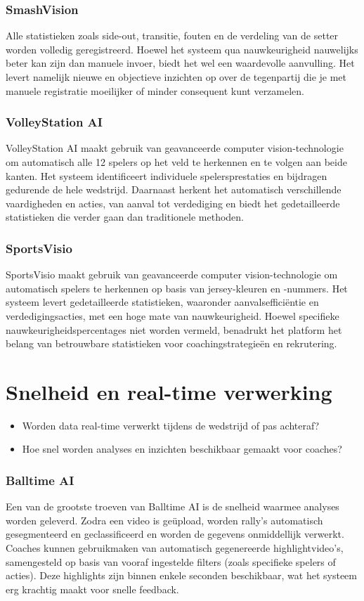 \subsubsection{SmashVision}
Alle statistieken zoals side-out, transitie, fouten en de verdeling van de setter worden volledig geregistreerd. Hoewel het systeem qua nauwkeurigheid nauwelijks beter kan zijn dan manuele invoer, biedt het wel een waardevolle aanvulling. Het levert namelijk nieuwe en objectieve inzichten op over de tegenpartij die je met manuele registratie moeilijker of minder consequent kunt verzamelen.
\subsubsection{VolleyStation AI}
VolleyStation AI maakt gebruik van geavanceerde computer vision-technologie om automatisch alle 12 spelers op het veld te herkennen en te volgen aan beide kanten. Het systeem identificeert individuele spelersprestaties en bijdragen gedurende de hele wedstrijd. Daarnaast herkent het automatisch verschillende vaardigheden en acties, van aanval tot verdediging en biedt het gedetailleerde statistieken die verder gaan dan traditionele methoden.
\subsubsection{SportsVisio}
SportsVisio maakt gebruik van geavanceerde computer vision-technologie om automatisch spelers te herkennen op basis van jersey-kleuren en -nummers. Het systeem levert gedetailleerde statistieken, waaronder aanvalsefficiëntie en verdedigingsacties, met een hoge mate van nauwkeurigheid. Hoewel specifieke nauwkeurigheidspercentages niet worden vermeld, benadrukt het platform het belang van betrouwbare statistieken voor coachingstrategieën en rekrutering.

\section{Snelheid en real-time verwerking}
\begin{itemize}
  \item Worden data real-time verwerkt tijdens de wedstrijd of pas achteraf?
  \item Hoe snel worden analyses en inzichten beschikbaar gemaakt voor coaches?
\end{itemize}
\subsubsection{Balltime AI}
Een van de grootste troeven van Balltime AI is de snelheid waarmee analyses worden geleverd. Zodra een video is geüpload, worden rally’s automatisch gesegmenteerd en geclassificeerd en worden de gegevens onmiddellijk verwerkt. Coaches kunnen gebruikmaken van automatisch gegenereerde highlightvideo’s, samengesteld op basis van vooraf ingestelde filters (zoals specifieke spelers of acties). Deze highlights zijn binnen enkele seconden beschikbaar, wat het systeem erg krachtig maakt voor snelle feedback.
